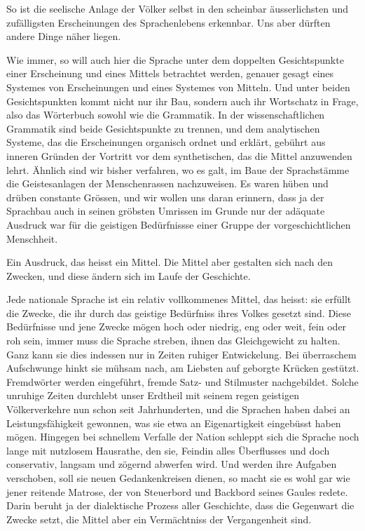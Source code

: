 \largerpage[-1]
So ist die seelische Anlage der Völker selbst in den scheinbar äusserlichsten und zufälligsten Erscheinungen des Sprachenlebens erkennbar. Uns aber dürften andere Dinge näher liegen.

Wie immer, so will auch hier die Sprache unter dem doppelten Gesichtspunkte einer Erscheinung und eines Mittels betrachtet werden, \label{fp.408} genauer gesagt eines Systemes von Erscheinungen und eines Systemes von Mitteln. Und unter beiden Gesichtspunkten kommt nicht nur ihr Bau, sondern auch ihr Wortschatz in Frage, also das Wörterbuch sowohl wie die Grammatik. In der wissenschaftlichen Grammatik sind beide Gesichtspunkte zu trennen, und dem analytischen Systeme, das die Erscheinungen organisch ordnet und erklärt, gebührt aus inneren Gründen der Vortritt vor dem synthetischen, das die Mittel anzuwenden lehrt. Ähnlich sind wir bisher verfahren, wo es galt, im Baue der Sprachstämme die Geistesanlagen der Menschenrassen nachzuweisen. Es waren hüben und drüben constante Grössen, und wir wollen uns daran erinnern, dass ja der Sprachbau auch in seinen gröbsten Umrissen im Grunde nur der adäquate Ausdruck war für die geistigen Bedürfnissse einer Gruppe der vorgeschichtlichen Menschheit.

Ein Ausdruck, das heisst ein Mittel. Die Mittel aber gestalten sich nach den Zwecken, und diese ändern sich im Laufe der Geschichte.

Jede nationale Sprache ist ein relativ vollkommenes Mittel, das heisst: sie erfüllt die Zwecke, die ihr durch das geistige Bedürfniss ihres Volkes gesetzt sind. Diese Bedürfnisse und jene Zwecke mögen hoch oder niedrig, eng oder weit, fein oder roh sein, immer muss die Sprache streben, ihnen das Gleichgewicht zu halten. Ganz kann sie dies indessen nur in Zeiten ruhiger Entwickelung. Bei überraschem Aufschwunge hinkt sie mühsam nach, am Liebsten auf geborgte Krücken gestützt. Fremdwörter werden eingeführt, fremde Satz- und Stilmuster nachgebildet. Solche unruhige Zeiten durchlebt unser Erdtheil mit seinem regen geistigen Völkerverkehre nun schon seit Jahrhunderten, und die Sprachen haben dabei an Leistungsfähigkeit gewonnen, was sie etwa an Eigenartigkeit eingebüsst haben mögen. Hingegen bei schnellem Verfalle der Nation schleppt sich die Sprache noch lange mit nutzlosem Hausrathe, den sie, Feindin alles Überflusses und doch conservativ, langsam und zögernd abwerfen wird. Und werden ihre Aufgaben verschoben, soll sie neuen Gedankenkreisen dienen, so macht sie es wohl gar wie jener reitende Matrose, der von Steuerbord und Backbord seines Gaules redete. Darin beruht ja der dialektische Prozess aller Geschichte, dass die Gegenwart die Zwecke setzt, die Mittel aber ein Vermächtniss der Vergangenheit sind.

